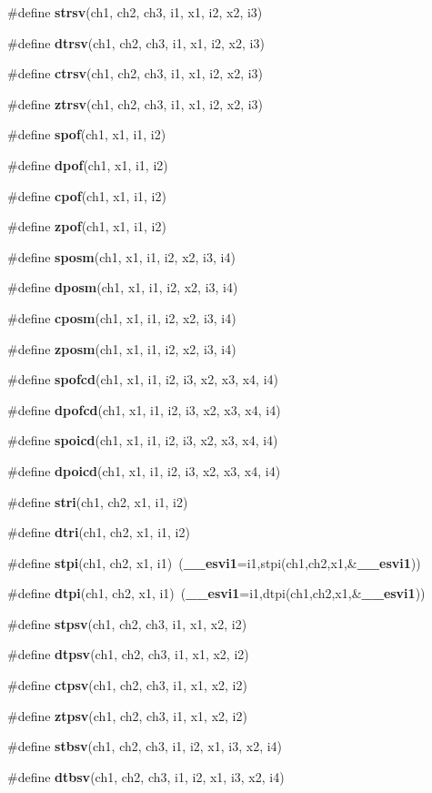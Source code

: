 \begin{CompactItemize}
\#define {\bf strsv}(ch1, ch2, ch3, i1, x1, i2, x2, i3)
\item 
\#define {\bf dtrsv}(ch1, ch2, ch3, i1, x1, i2, x2, i3)
\item 
\#define {\bf ctrsv}(ch1, ch2, ch3, i1, x1, i2, x2, i3)
\item 
\#define {\bf ztrsv}(ch1, ch2, ch3, i1, x1, i2, x2, i3)
\item 
\#define {\bf spof}(ch1, x1, i1, i2)
\item 
\#define {\bf dpof}(ch1, x1, i1, i2)
\item 
\#define {\bf cpof}(ch1, x1, i1, i2)
\item 
\#define {\bf zpof}(ch1, x1, i1, i2)
\item 
\#define {\bf sposm}(ch1, x1, i1, i2, x2, i3, i4)
\item 
\#define {\bf dposm}(ch1, x1, i1, i2, x2, i3, i4)
\item 
\#define {\bf cposm}(ch1, x1, i1, i2, x2, i3, i4)
\item 
\#define {\bf zposm}(ch1, x1, i1, i2, x2, i3, i4)
\item 
\#define {\bf spofcd}(ch1, x1, i1, i2, i3, x2, x3, x4, i4)
\item 
\#define {\bf dpofcd}(ch1, x1, i1, i2, i3, x2, x3, x4, i4)
\item 
\#define {\bf spoicd}(ch1, x1, i1, i2, i3, x2, x3, x4, i4)
\item 
\#define {\bf dpoicd}(ch1, x1, i1, i2, i3, x2, x3, x4, i4)
\item 
\#define {\bf stri}(ch1, ch2, x1, i1, i2)
\item 
\#define {\bf dtri}(ch1, ch2, x1, i1, i2)
\item 
\#define {\bf stpi}(ch1, ch2, x1, i1)~({\bf \_\-\_\-esvi1}=i1,stpi(ch1,ch2,x1,\&{\bf \_\-\_\-esvi1}))
\item 
\#define {\bf dtpi}(ch1, ch2, x1, i1)~({\bf \_\-\_\-esvi1}=i1,dtpi(ch1,ch2,x1,\&{\bf \_\-\_\-esvi1}))
\item 
\#define {\bf stpsv}(ch1, ch2, ch3, i1, x1, x2, i2)
\item 
\#define {\bf dtpsv}(ch1, ch2, ch3, i1, x1, x2, i2)
\item 
\#define {\bf ctpsv}(ch1, ch2, ch3, i1, x1, x2, i2)
\item 
\#define {\bf ztpsv}(ch1, ch2, ch3, i1, x1, x2, i2)
\item 
\#define {\bf stbsv}(ch1, ch2, ch3, i1, i2, x1, i3, x2, i4)
\item 
\#define {\bf dtbsv}(ch1, ch2, ch3, i1, i2, x1, i3, x2, i4)
\item 

\end{CompactItemize}
